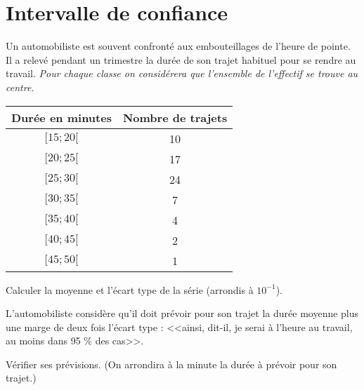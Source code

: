 \section{Intervalle de confiance}

Un automobiliste est souvent confronté aux embouteillages de l'heure de pointe. Il a relevé pendant un trimestre la durée de son trajet habituel pour se rendre au travail. \emph{Pour chaque classe on considérera que l'ensemble de l'effectif se trouve au centre.}

\vspace*{0.5cm}

\begin{center}
	\begin{tabular}{|c|c|}
	\hline
	Durée en minutes & Nombre de trajets \\ \hline
	$[15 ; 20[$        & 10                \\ \hline
	$[20 ; 25[$        & 17                \\ \hline
	$[25 ; 30[$        & 24                \\ \hline
	$[30 ; 35[$        & 7                 \\ \hline
	$[35 ; 40[$        & 4                 \\ \hline
	$[40 ; 45[$        & 2                 \\ \hline
	$[45 ; 50[$        & 1                 \\ \hline
\end{tabular}
\end{center}

\begin{questions}
	\question Calculer la moyenne et l'écart type de la série (arrondis à $10^{-1}$).
	
	\question L'automobiliste considère qu'il doit prévoir pour son trajet la durée moyenne plus une marge de deux fois l'écart type : <<ainsi, dit-il, je serai à l'heure au travail, au moins dans 95 \% des cas>>.
	
	Vérifier ses prévisions. (On arrondira à la minute la durée à prévoir pour son trajet.)
\end{questions}